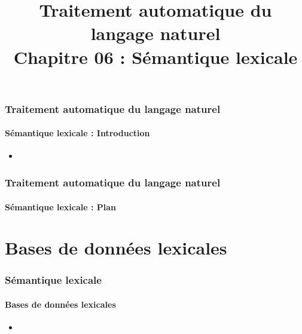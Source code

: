 \documentclass[xcolor=table]{beamer}
\title[TALN : 06- Sémantique lexicale]%
{Traitement automatique du langage naturel\\Chapitre 06 : Sémantique lexicale}
\begin{document}
	
\begin{frame}
\frametitle{Traitement automatique du langage naturel}
\framesubtitle{Sémantique lexicale : Introduction}

%		

\begin{itemize}
	\item 
\end{itemize}

\end{frame}

%
%

\begin{frame}
\frametitle{Traitement automatique du langage naturel}
\framesubtitle{Sémantique lexicale : Plan}

\begin{multicols}{2}
\tableofcontents
\end{multicols}
\end{frame}

\section{Bases de données lexicales}

\begin{frame}
	\frametitle{Sémantique lexicale}
	\framesubtitle{Bases de données lexicales}
	
	\begin{itemize}
		\item 
	\end{itemize}
	
\end{frame}
\end{document}
